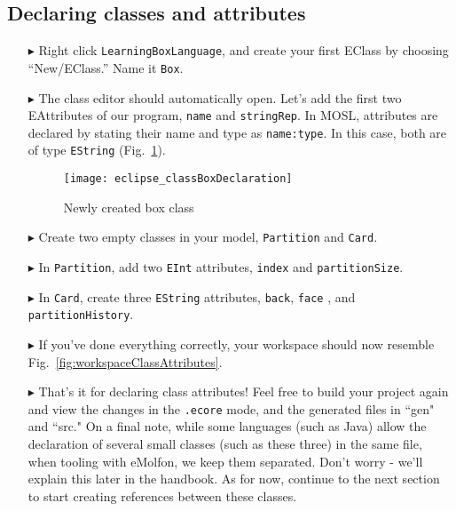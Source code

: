 \newpage
\subsection{Declaring classes and attributes}
\texHeader
\hypertarget{static:classes tex}{}

\begin{itemize}

\item[$\blacktriangleright$] Right click \texttt{LearningBoxLanguage}, and create your first EClass by choosing ``New/EClass.'' Name it \texttt{Box}.

\item[$\blacktriangleright$] The class editor should automatically open. Let's add the first two EAttributes of our program, \texttt{name} and
\texttt{stringRep}. In MOSL, attributes are declared by stating their name and type as \texttt{name:type}. In this case, both are of type \texttt{EString}
(Fig.~\ref{fig:boxDeclaration}).

\vspace{0.5cm}

\begin{figure}[htbp]
	\centering
  \texttt{[image: eclipse\_classBoxDeclaration]}
	\caption{Newly created box class}
	\label{fig:boxDeclaration}
\end{figure} 

\vspace{0.5cm}

\item[$\blacktriangleright$] Create two empty classes in your model, \texttt{Partition} and \texttt{Card}.

\item[$\blacktriangleright$] In \texttt{Partition}, add two \texttt{EInt} attributes, \texttt{index} and \texttt{partitionSize}.

\item[$\blacktriangleright$] In \texttt{Card}, create three \texttt{EString} attributes, \texttt{back}, \texttt{face} , and \texttt{partitionHistory}.

\item[$\blacktriangleright$] If you've done everything correctly, your workspace should now resemble Fig.~\ref{fig:workspaceClassAttributes}.

\item[$\blacktriangleright$] That's it for declaring class attributes! Feel free to build your project again and view the changes in the \texttt{.ecore}
mode, and the generated files in ``gen" and ``src." On a final note, while some languages (such as Java) allow the declaration of several small classes (such as
these three) in the same file, when tooling with eMolfon, we keep them separated. Don't worry - we'll explain this later in the handbook. As for now, continue
to the next section to start creating references between these classes.


\end{itemize}
